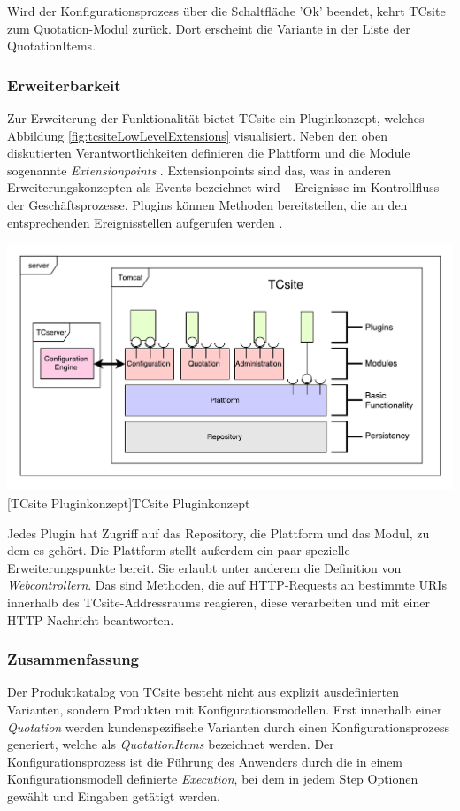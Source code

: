 \documentclass[11pt, a4paper, titlepage, listof=totoc, bibliography=totoc, index=totoc, twoside, openright, headings=normal]{scrreprt}
\begin{document}
Wird der Konfigurationsprozess über die Schaltfläche 'Ok' beendet, kehrt TCsite zum Quotation-Modul zurück. Dort erscheint die Variante in der Liste der QuotationItems.

\subsubsection{Erweiterbarkeit}
\label{TCsiteErweiterbarkeit}

Zur Erweiterung der Funktionalität bietet TCsite ein Pluginkonzept, welches Abbildung \ref{fig:tcsiteLowLevelExtensions} visualisiert. Neben den oben diskutierten Verantwortlichkeiten definieren die Plattform und die Module sogenannte \emph{Extensionpoints} \citep{tactonTCsiteApiDocu}. Extensionpoints sind das, was in anderen Erweiterungskonzepten als Events bezeichnet wird -- Ereignisse im Kontrollfluss der Geschäftsprozesse. Plugins können Methoden bereitstellen, die an den entsprechenden Ereignisstellen aufgerufen werden  \citep{tactonTCsiteDevelopmentManual}.

\vspace{1em}
\begin{minipage}{\linewidth}
	\centering
	\includegraphics[width=0.8\linewidth]{Abbildungen/tcsiteLowLevelExtensions.pdf}
	[TCsite Pluginkonzept]{TCsite Pluginkonzept}
	\label{fig:tcsiteLowLevelExtensions}
\end{minipage}
\vspace{0.3em}

Jedes Plugin hat Zugriff auf das Repository, die Plattform und das Modul, zu dem es gehört. Die Plattform stellt außerdem ein paar spezielle Erweiterungspunkte bereit. Sie erlaubt unter anderem die Definition von \emph{Webcontrollern}. Das sind Methoden, die auf HTTP-Requests an bestimmte URIs innerhalb des TCsite-Addressraums reagieren, diese verarbeiten und mit einer HTTP-Nachricht beantworten.

\subsubsection*{Zusammenfassung}
Der Produktkatalog von TCsite besteht nicht aus explizit ausdefinierten Varianten, sondern Produkten mit Konfigurationsmodellen. Erst innerhalb einer \emph{Quotation} werden kundenspezifische Varianten durch einen Konfigurationsprozess generiert, welche als \emph{QuotationItems} bezeichnet werden. Der Konfigurationsprozess ist die Führung des Anwenders durch die in einem Konfigurationsmodell definierte \emph{Execution}, bei dem in jedem Step Optionen gewählt und Eingaben getätigt werden.
\end{document}
